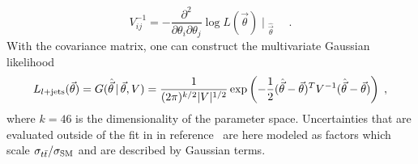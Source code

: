 



\begin{equation}
  V_{ij}^{-1} = - \frac{\partial^2 }{\partial \theta_i \partial \theta_j} \log L(\vec{\theta})\; {\bigg | \;}_{\hat{\vec{\theta}}} \; \quad .
\end{equation}
With the covariance matrix, one can construct the multivariate Gaussian likelihood 
\begin{equation} \label{eqn:ljetsLikelihood}
  L_{l+\rm jets}(\vec{\theta}) = G(\hat{\vec{\theta}}\, |\, \vec{\theta}, V) = \frac{1}{(2\pi)^{k/2} | V|^{1/2}} \exp\left( -\frac{1}{2} (\hat{\vec{\theta}} - \vec{\theta})^T  V^{-1} (\hat{\vec{\theta}} - \vec{\theta})  \right) \;, 
\end{equation}
where $k=46$ is the dimensionality of the parameter space.  
Uncertainties that are evaluated outside of the fit in in reference~\cite{LEPTON_JETS_NOTE_2011} are here modeled as factors which scale $\sigma_{t\bar{t}}/\sigma_{\rm SM}$ and are described by Gaussian terms.


